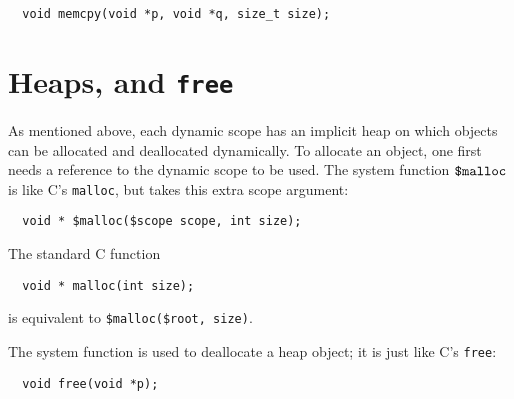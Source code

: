 \begin{verbatim}
  void memcpy(void *p, void *q, size_t size);
\end{verbatim}

\section{Heaps, \cmalloc{} and \texttt{free}}

As mentioned above, each dynamic scope has an implicit heap on which
objects can be allocated and deallocated dynamically.  To allocate an
object, one first needs a reference to the dynamic scope to be used.
The system function $\mbox{\texttt{\${}malloc}}$ is like C's \texttt{malloc}, but takes
this extra scope argument:
\begin{verbatim}
  void * $malloc($scope scope, int size);
\end{verbatim}
The standard C function
\begin{verbatim}
  void * malloc(int size);
\end{verbatim}
is equivalent to \verb!$malloc($root, size)!.

The system function  is used to deallocate a heap object;
it is just like C's \texttt{free}:
\begin{verbatim}
  void free(void *p);
\end{verbatim}





